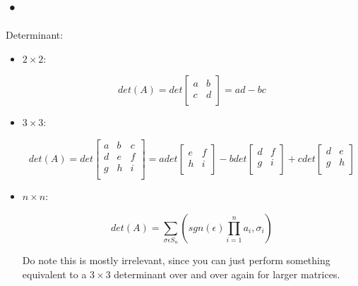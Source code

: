 \documentclass{report}
\begin{document}
\subsection{•}
Determinant:
\begin{itemize}
\item$2\times2$:

$$det(A)=det\begin{bmatrix}a&b\\c&d\\\end{bmatrix}=ad-bc$$
\item$3\times3$:

$$det(A)=det\begin{bmatrix}a&b&c\\d&e&f\\g&h&i\\\end{bmatrix}=adet\begin{bmatrix}e&f\\h&i\\\end{bmatrix}-bdet\begin{bmatrix}d&f\\g&i\\\end{bmatrix}+cdet\begin{bmatrix}d&e\\g&h\\\end{bmatrix}$$

\item$n\times n$:

$$det(A)=\sum_{\sigma\epsilon S_n}(sgn(\epsilon)\prod_{i=1}^{n}a_i,\sigma_i )$$

Do note this is mostly irrelevant, since you can just perform something equivalent to a $3\times3$ determinant over and over again for larger matrices.
\end{itemize}
\end{document}
